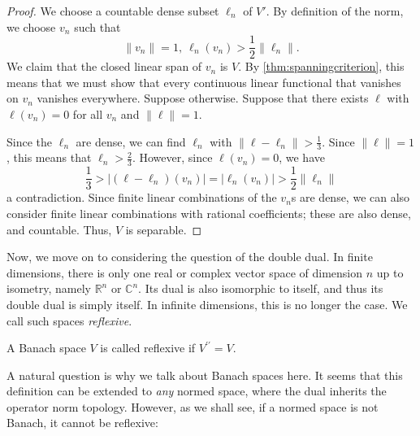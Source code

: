 \documentclass[twoside,symmetric, openany, 12pt]{./tuftebook}
\theoremstyle{definition}
\theoremstyle{definition}
\theoremstyle{definition}
\newcommand{\R}{\mathbb{R}}
\newcommand{\C}{\mathbb{C}}
\begin{document}
\begin{proof}
	We choose a countable dense subset $\ell_n$ of $V'$. By definition of the norm, we choose $v_n$ such that
	\[
	\|v_n\|=1,~ \ell_n(v_n)>\frac{1}{2}\|\ell_n\|
	.\] 
	We claim that the closed linear span of $v_n$ is $V$. By \ref{thm:spanningcriterion}, this means that we must show that every continuous linear functional that vanishes on $v_n$ vanishes everywhere. Suppose otherwise. Suppose that there exists $\ell$ with $\ell(v_n)=0$ for all $v_n$ and $\| \ell\| = 1$. 
	
	Since the $\ell_n$ are dense, we can find $\ell_n$ with $\| \ell - \ell_n\| > \frac 13$. Since $\|\ell\|=1$, this means that $\ell_n > \frac 23$. However, since $\ell(v_n)=0$, we have
	\[\frac 13 > |(\ell - \ell_n)(v_n)| = |\ell_n(v_n)|> \frac 12 \| \ell_n\|\]
	a contradiction. Since finite linear combinations of the $v_n$s are dense, we can also consider finite linear combinations with rational coefficients; these are also dense, and countable. Thus, $V$ is separable. 
\end{proof}
Now, we move on to considering the question of the double dual. In finite dimensions, there is only one real or complex vector space of dimension $n$ up to isometry, namely $\R^n$ or $\C^n$. Its dual is also isomorphic to itself, and thus its double dual is simply itself. In infinite dimensions, this is no longer the case. We call such spaces \emph{reflexive}.
\begin{Definition}
	A Banach space $V$ is called reflexive if $V^{\prime\prime}=V$.  
\end{Definition}
A natural question is why we talk about Banach spaces here. It seems that this definition can be extended to \emph{any} normed space, where the dual inherits the operator norm topology. However, as we shall see, if a normed space is not Banach, it cannot be reflexive:
\end{document}
